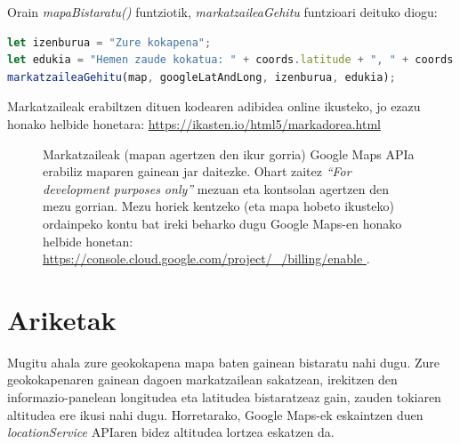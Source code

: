 Orain \textit{mapaBistaratu()} funtziotik, \textit{markatzaileaGehitu} funtzioari deituko diogu:
\begin{lstlisting}[language=JavaScript]
let izenburua = "Zure kokapena";
let edukia = "Hemen zaude kokatua: " + coords.latitude + ", " + coords.longitude;
markatzaileaGehitu(map, googleLatAndLong, izenburua, edukia);
\end{lstlisting}

Markatzaileak erabiltzen dituen kodearen adibidea online ikusteko, jo ezazu honako helbide honetara: \newline
\href{https://ikasten.io/html5/markadorea.html}{https://ikasten.io/html5/markadorea.html}
\begin{figure}[ht]
	\centering
{}
\caption{Markatzaileak (mapan agertzen den ikur gorria) Google Maps APIa erabiliz maparen gainean jar daitezke. Ohart zaitez \textit{``For development purposes only''} mezuan eta kontsolan agertzen den mezu gorrian. Mezu horiek kentzeko (eta mapa hobeto ikusteko) ordainpeko kontu bat ireki beharko dugu Google Maps-en honako helbide honetan: \href{https://console.cloud.google.com/project/\_/billing/enable }{https://console.cloud.google.com/project/\_/billing/enable }.}
\label{fig:markadorea}
\end{figure}

\section{Ariketak}

Mugitu ahala zure geokokapena mapa baten gainean bistaratu nahi dugu. Zure geokokapenaren gainean dagoen markatzailean sakatzean, irekitzen den informazio-panelean longitudea eta latitudea bistaratzeaz gain, zauden tokiaren altitudea ere ikusi nahi dugu. Horretarako, Google Maps-ek eskaintzen duen \textit{locationService} APIaren bidez altitudea lortzea eskatzen da. 


